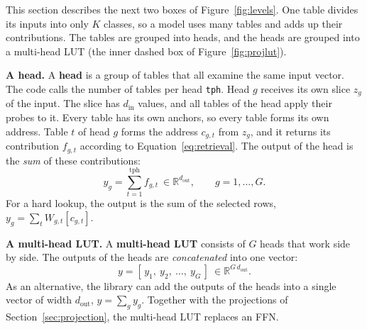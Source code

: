 \documentclass[11pt]{article}
\DeclareRobustCommand{\code}[1]{{\renewcommand{\_}{\textunderscore\allowbreak}\texttt{#1}}}
\newcommand{\term}[1]{\textbf{#1}}
\begin{document}
This section describes the next two boxes of Figure~\ref{fig:levels}. One table divides its inputs into
only $K$ classes, so a model uses many tables and adds up their contributions. The tables are grouped
into heads, and the heads are grouped into a multi-head LUT (the inner dashed box of
Figure~\ref{fig:projlut}).

\textbf{A head.} A \term{head} is a group of tables that all examine the same input vector. The code
calls the number of tables per head \code{tph}. Head $g$ receives its own slice $z_g$ of the input. The
slice has $d_\text{in}$ values, and all tables of the head apply their probes to it. Every table has its
own anchors, so every table forms its own address. Table $t$ of head $g$ forms the address $c_{g,t}$
from $z_g$, and it returns its contribution $f_{g,t}$ according to Equation~\eqref{eq:retrieval}. The
output of the head is the \emph{sum} of these contributions:
\begin{equation}\label{eq:head}
  y_g=\sum_{t=1}^{\text{tph}} f_{g,t}\ \in\mathbb{R}^{d_\text{out}}, \qquad g=1,\ldots,G .
\end{equation}
For a hard lookup, the output is the sum of the selected rows, $y_g=\sum_t W_{g,t}[c_{g,t}]$.

\textbf{A multi-head LUT.} A \term{multi-head LUT} consists of $G$ heads that work side by side. The
outputs of the heads are \emph{concatenated} into one vector:
\begin{equation}\label{eq:concat}
  y=[\,y_1,\ y_2,\ \ldots,\ y_G\,]\ \in\mathbb{R}^{G\,d_\text{out}} .
\end{equation}
As an alternative, the library can add the outputs of the heads into a single vector of width
$d_\text{out}$, $y=\sum_g y_g$. Together with the projections of Section~\ref{sec:projection}, the
multi-head LUT replaces an FFN.
\end{document}

